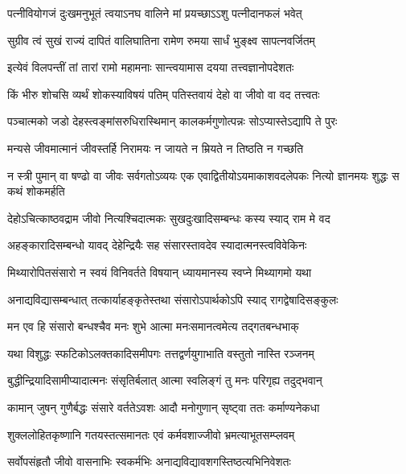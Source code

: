 \twolineshloka
{पत्नीवियोगजं दुःखमनुभूतं त्वयाऽनघ}
{वालिने मां प्रयच्छाऽऽशु पत्नीदानफलं भवेत्} %

\twolineshloka
{सुग्रीव त्वं सुखं राज्यं दापितं वालिघातिना}
{रामेण रुमया सार्धं भुङ्क्ष्व सापत्नवर्जितम्} %

\twolineshloka
{इत्येवं विलपन्तीं तां तारां रामो महामनाः}
{सान्त्वयामास दयया तत्त्वज्ञानोपदेशतः} %

\twolineshloka
{किं भीरु शोचसि व्यर्थं शोकस्याविषयं पतिम्}
{पतिस्तवायं देहो वा जीवो वा वद तत्त्वतः} %

\twolineshloka
{पञ्चात्मको जडो देहस्त्वङ्मांसरुधिरास्थिमान्}
{कालकर्मगुणोत्पन्नः सोऽप्यास्तेऽद्यापि ते पुरः} %

\twolineshloka
{मन्यसे जीवमात्मानं जीवस्तर्हि निरामयः}
{न जायते न म्रियते न तिष्ठति न गच्छति} %

\threelineshloka
{न स्त्री पुमान् वा षण्ढो वा जीवः सर्वगतोऽव्ययः}
{एक एवाद्वितीयोऽयमाकाशवदलेपकः}
{नित्यो ज्ञानमयः शुद्धः स कथं शोकमर्हति} %


\twolineshloka
{देहोऽचित्काष्ठवद्राम जीवो नित्यश्चिदात्मकः}
{सुखदुःखादिसम्बन्धः कस्य स्याद् राम मे वद} %


\twolineshloka
{अहङ्कारादिसम्बन्धो यावद् देहेन्द्रियैः सह}
{संसारस्तावदेव स्यादात्मनस्त्वविवेकिनः} %

\twolineshloka
{मिथ्यारोपितसंसारो न स्वयं विनिवर्तते}
{विषयान् ध्यायमानस्य स्वप्ने मिथ्यागमो यथा} %

\twolineshloka
{अनाद्यविद्यासम्बन्धात् तत्कार्याहङ्कृतेस्तथा}
{संसारोऽपार्थकोऽपि स्याद् रागद्वेषादिसङ्कुलः} %

\twolineshloka
{मन एव हि संसारो बन्धश्चैव मनः शुभे}
{आत्मा मनःसमानत्वमेत्य तद्गतबन्धभाक्} %

\twolineshloka
{यथा विशुद्धः स्फटिकोऽलक्तकादिसमीपगः}
{तत्तद्वर्णयुगाभाति वस्तुतो नास्ति रञ्जनम्} %

\twolineshloka
{बुद्धीन्द्रियादिसामीप्यादात्मनः संसृतिर्बलात्}
{आत्मा स्वलिङ्गं तु मनः परिगृह्य तदुद्भवान्} %

\twolineshloka
{कामान् जुषन् गुणैर्बद्धः संसारे वर्ततेऽवशः}
{आदौ मनोगुणान् सृष्ट्वा ततः कर्माण्यनेकधा} %

\twolineshloka
{शुक्ललोहितकृष्णानि गतयस्तत्समानतः}
{एवं कर्मवशाज्जीवो भ्रमत्याभूतसम्प्लवम्} %

\twolineshloka
{सर्वोपसंहृतौ जीवो वासनाभिः स्वकर्मभिः}
{अनाद्यविद्यावशगस्तिष्ठत्यभिनिवेशतः} %


